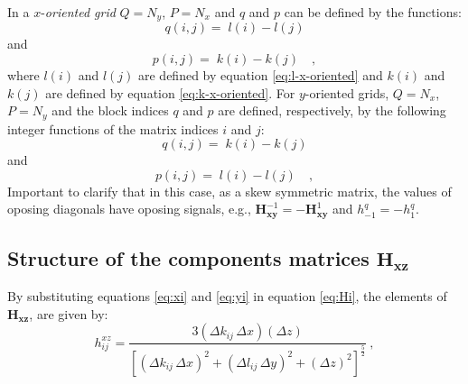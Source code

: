 In a $x$-\textit{oriented grid} $Q = N_{y}$, $P = N_{x}$ and $q$ and $p$ can be defined by the functions:
\begin{equation}
	q(i, j) = \; l(i) - l(j) 
	\label{eq:Hxy-q-x-oriented}
\end{equation}
and
\begin{equation}
	p(i, j) = \; k(i) - k(j) \quad ,
	\label{eq:Hxy-p-x-oriented}
\end{equation}
where $l(i)$ and $l(j)$ are defined by equation \ref{eq:l-x-oriented} 
and $k(i)$ and $k(j)$ are defined by equation \ref{eq:k-x-oriented}.
For $y$-oriented grids, $Q = N_{x}$, $P = N_{y}$ and the block indices
$q$ and $p$ are defined, respectively, by the following integer functions 
of the matrix indices $i$ and $j$:
\begin{equation}
	q(i, j) = \;  k(i) - k(j)  
	\label{eq:Hxy-q-y-oriented}
\end{equation}
and
\begin{equation}
	p(i, j) = \;  l(i) - l(j)  \quad ,
	\label{eq:Hxy-p-y-oriented}
\end{equation}
Important to clarify that in this case, as a skew symmetric matrix, the values of oposing diagonals have oposing signals, e.g., $\mathbf{H}^{-1}_\mathbf{xy} = -\mathbf{H}^{1}_\mathbf{xy}$ and $h^{q}_{-1} = -h^{q}_{1} $.

\subsection{Structure of the components matrices $\mathbf{H_{xz}}$}

By substituting equations \ref{eq:xi} and \ref{eq:yi} in equation \ref{eq:Hi}, the elements of $\mathbf{H_{xz}}$, are given by:
\begin{equation}
	h^{xz}_{ij} = \frac{3 (\Delta k_{ij} \, \Delta x)(\Delta z)}{\left[ 
		\left( \Delta k_{ij} \, \Delta x \right)^{2} + 
		\left( \Delta l_{ij} \, \Delta y \right)^{2} + 
		\left( \Delta z \right)^{2} \right]^{\frac{5}{2}}} \: ,
	\label{eq:hxz_mag}
\end{equation}

